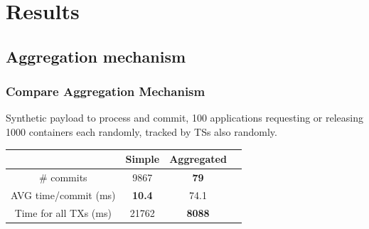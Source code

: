 \documentclass{beamer}
\begin{document}
\section{Results}
\subsection{Aggregation mechanism}
\begin{frame}
\frametitle{Compare Aggregation Mechanism}
Synthetic payload to process and commit, 100 applications requesting or releasing
1000 containers each randomly, tracked by TSs also randomly. \\[2em]

\centering
\begin{tabular}{| c | c | c | c |}
\hline
  & Simple & Aggregated \\
\hline
\# commits & 9867 & \textbf{79} \\
\hline
AVG time/commit (ms) & \textbf{10.4} & 74.1 \\
\hline
Time for all TXs (ms) & 21762 & \textbf{8088} \\
\hline
\end{tabular}
\end{frame}
\end{document}
